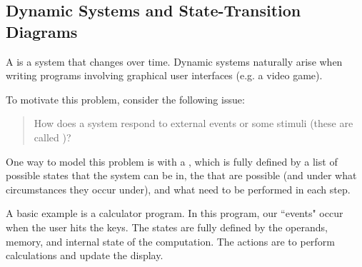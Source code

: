  \subsection{Dynamic Systems and State-Transition Diagrams}
 
A  is a system that changes over time. Dynamic systems naturally arise when writing programs involving graphical user interfaces (e.g. a video game).  

To motivate this problem, consider the following issue:
\begin{quote}
    How does a system respond to external events or some stimuli (these are called )?
\end{quote}


One way to model this problem is with a , which is fully defined by a list of possible states that the system can be in, the  that are possible (and under what circumstances they occur under), and what  need to be performed in each step. 

A basic example is a calculator program. In this program, our ``events" occur when the user hits the keys. The states are fully defined by the operands, memory, and internal state of the computation. The actions are to perform calculations and update the display. \\

